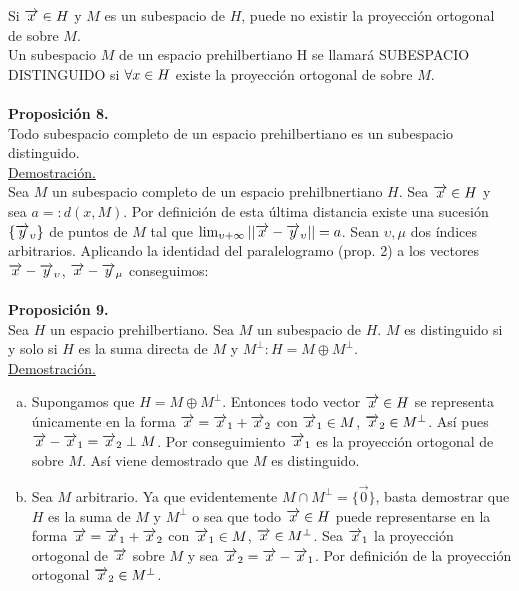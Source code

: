 Si $\overrightarrow{x} \in H$ y $M$ es un subespacio de $H$, puede no existir la proyección ortogonal de \xraya \phantom{} sobre $M$. \\
Un subespacio $M$ de un espacio prehilbertiano H se llamará SUBESPACIO DISTINGUIDO si $\forall x \in H$ existe la proyección ortogonal de \xraya \phantom{} sobre $M$. \\ \\
\textbf{Proposición 8.} \\
Todo subespacio completo de un espacio prehilbertiano es un subespacio distinguido.\\
\underline{Demostración.}\\
Sea $M$ un subespacio completo de un espacio prehilbnertiano $H$. Sea $\overrightarrow{x} \in H$ y sea $a=:d(x,M)$. Por definición de esta última distancia existe una sucesión $\lbrace \overrightarrow{y}_\upsilon \rbrace$ de puntos de $M$ tal que $\lim_{\upsilon + \infty}||\overrightarrow{x} -\overrightarrow{y}_\upsilon||=a$. Sean $\upsilon, \mu$ dos índices arbitrarios. Aplicando la identidad del paralelogramo (prop. 2) a los vectores $\overrightarrow{x} - \overrightarrow{y}_\upsilon$, $\overrightarrow{x}-\overrightarrow{y}_\mu$ conseguimos:
\\ \\
\textbf{Proposición 9.}\\
Sea $H$ un espacio prehilbertiano. Sea $M$ un subespacio de $H$. $M$ es distinguido si y solo si $H$ es la suma directa de $M$ y $M^{\perp}:H=M\oplus M^{\perp}$. \\
\underline{Demostración.}\\
\begin{enumerate}[a)]
\item Supongamos que $H=M \oplus M^{\perp}$. Entonces todo vector $\overrightarrow{x} \in H$ se representa únicamente en la forma $\overrightarrow{x}=\overrightarrow{x}_1+\overrightarrow{x}_2$ con $\overrightarrow{x}_1 \in M$, $\overrightarrow{x}_2 \in M^{\perp}$. Así pues $\overrightarrow{x}-\overrightarrow{x}_1=\overrightarrow{x}_2 \perp M$. Por conseguimiento $\overrightarrow{x}_1$ es la proyección ortogonal de \xraya \phantom{} sobre $M$. Así viene demostrado que $M$ es distinguido.
\item Sea $M$ arbitrario. Ya que evidentemente $M \cap M^{\perp}=\lbrace \overrightarrow{0} \rbrace$, basta demostrar que $H$ es la suma de $M$ y $M^\perp$ o sea que todo $\overrightarrow{x} \in H$  puede representarse en la forma $\overrightarrow{x}=\overrightarrow{x}_1+\overrightarrow{x}_2$ con $\overrightarrow{x}_1 \in M$, $\overrightarrow{x} \in M^{\perp}$. Sea $\overrightarrow{x}_1$ la proyección ortogonal de $\overrightarrow{x}$ sobre $M$ y sea $\overrightarrow{x}_2=\overrightarrow{x}-\overrightarrow{x}_1$. Por definición de la proyección ortogonal $\overrightarrow{x}_2 \in M^{\perp}$.

\end{enumerate}

